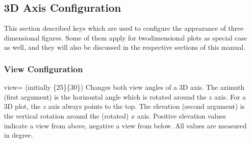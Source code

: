 

\subsection{3D Axis Configuration}
This section described keys which are used to configure the appearance of three dimensional figures. Some of them apply for twodimensional plots as special case as well, and they will also be discussed in the respective sections of this manual.

\subsubsection{View Configuration}
\begin{pgfplotskey}{view= (initially \{25\}\{30\})}
	Changes both view angles of a 3D axis. The azimuth (first argument) is the horizontal angle which is rotated around the $z$ axis. For a 3D plot, the $z$ axis always points to the top. The elevation (second argument) is the vertical rotation around the (rotated) $x$ axis. Positive elevation values indicate a view from above, negative a view from below. All values are measured in degree.

\pgfplotsexpensiveexample
\begin{codeexample}[]
\end{codeexample}

\pgfplotsexpensiveexample
\begin{codeexample}[]
\end{codeexample}

\pgfplotsexpensiveexample
\begin{codeexample}[]
\end{codeexample}
\end{pgfplotskey}


